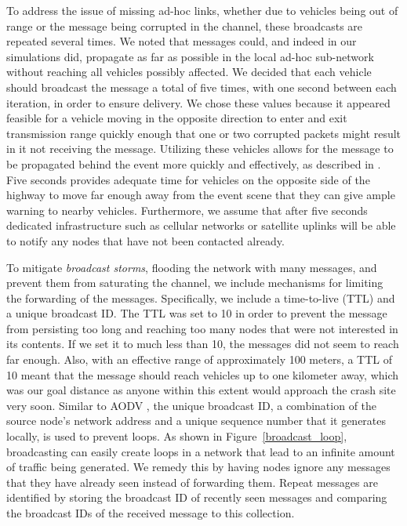 \documentclass{IEEEtran}
\begin{document}
To address the issue of missing ad-hoc links, whether due to vehicles being out of range or the message being corrupted in the channel, these broadcasts are repeated several times.
We noted that messages could, and indeed in our simulations did, propagate as far as possible in the local ad-hoc sub-network without reaching all vehicles possibly affected.
We decided that each vehicle should broadcast the message a total of five times, with one second between each iteration, in order to ensure delivery.
We chose these values because it appeared feasible for a vehicle moving in the opposite direction to enter and exit transmission range quickly enough that one or two corrupted packets might result in it not receiving the message.
Utilizing these vehicles allows for the message to be propagated behind the event more quickly and effectively, as described in \cite{vanet_dissem}.
Five seconds provides adequate time for vehicles on the opposite side of the highway to move far enough away from the event scene that they can give ample warning to nearby vehicles.
Furthermore, we assume that after five seconds dedicated infrastructure such as cellular networks or satellite uplinks will be able to notify any nodes that have not been contacted already.

To mitigate \emph{broadcast storms}, flooding the network with many messages, and prevent them from saturating the channel, we include mechanisms for limiting the forwarding of the messages.
Specifically, we include a time-to-live (TTL) and a unique broadcast ID.
The TTL was set to 10 in order to prevent the message from persisting too long and reaching too many nodes that were not interested in its contents.
If we set it to much less than 10, the messages did not seem to reach far enough.
Also, with an effective range of approximately 100 meters, a TTL of 10 meant that the message should reach vehicles up to one kilometer away, which was our goal distance as anyone within this extent would approach the crash site very soon.
Similar to AODV \cite{aodv}, the unique broadcast ID, a combination of the source node's network address and a unique sequence number that it generates locally, is used to prevent loops.
As shown in Figure~\ref{broadcast_loop}, broadcasting can easily create loops in a network that lead to an infinite amount of traffic being generated.
We remedy this by having nodes ignore any messages that they have already seen instead of forwarding them.
Repeat messages are identified by storing the broadcast ID of recently seen messages and comparing the broadcast IDs of the received message to this collection.
\end{document}
